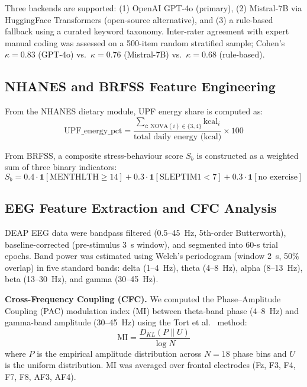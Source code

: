 \documentclass[journal]{IEEEtran}
\begin{document}
Three backends are supported: (1) OpenAI GPT-4o (primary), (2) Mistral-7B via
HuggingFace Transformers (open-source alternative), and (3) a rule-based fallback
using a curated keyword taxonomy. Inter-rater agreement with expert manual coding
was assessed on a 500-item random stratified sample; Cohen's $\kappa = 0.83$
(GPT-4o) vs.\ $\kappa = 0.76$ (Mistral-7B) vs.\ $\kappa = 0.68$ (rule-based).

\subsection{NHANES and BRFSS Feature Engineering}

From the NHANES dietary module, UPF energy share is computed as:
\begin{equation}
\text{UPF}\_\text{energy}\_\text{pct} =
  \frac{\sum_{i:\,\text{NOVA}(i) \in \{3,4\}} \text{kcal}_i}
       {\text{total daily energy (kcal)}} \times 100
\label{eq:upf_pct}
\end{equation}

From BRFSS, a composite stress-behaviour score $S_b$ is constructed as a
weighted sum of three binary indicators:
\begin{equation}
S_b = 0.4 \cdot \mathbf{1}[\text{MENTHLTH} \geq 14]
    + 0.3 \cdot \mathbf{1}[\text{SLEPTIM1} < 7]
    + 0.3 \cdot \mathbf{1}[\text{no exercise}]
\label{eq:stress_score}
\end{equation}

\subsection{EEG Feature Extraction and CFC Analysis}

DEAP EEG data were bandpass filtered (0.5--45~Hz, 5th-order Butterworth),
baseline-corrected (pre-stimulus 3~s window), and segmented into 60-s trial
epochs. Band power was estimated using Welch's periodogram (window 2~s,
50\% overlap) in five standard bands: delta (1--4~Hz), theta (4--8~Hz),
alpha (8--13~Hz), beta (13--30~Hz), and gamma (30--45~Hz).

\textbf{Cross-Frequency Coupling (CFC).} We computed the Phase--Amplitude
Coupling (PAC) modulation index (MI) between theta-band phase (4--8~Hz) and
gamma-band amplitude (30--45~Hz) using the Tort et al.\ \cite{tort2010} method:
\begin{equation}
\text{MI} = \frac{D_{KL}(P \| U)}{\log N}
\label{eq:pac_mi}
\end{equation}
where $P$ is the empirical amplitude distribution across $N=18$ phase bins and
$U$ is the uniform distribution. MI was averaged over frontal electrodes
(Fz, F3, F4, F7, F8, AF3, AF4).
\end{document}
